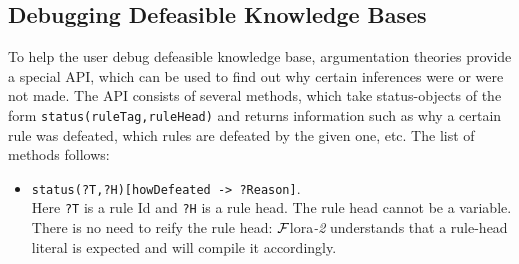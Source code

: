 \documentclass[11pt]{article}
\newcommand{\FLORA}{{\mbox{\sc ${\cal F}${lora}\rm\emph{-2}}}\xspace}
\begin{document}
\subsection{Debugging Defeasible Knowledge Bases}
\label{sec-debugging-defeat}

To help the user debug defeasible knowledge base, argumentation
theories provide a special API, which can be used to find out
why certain inferences were or were not made.
The API consists of several methods, which take status-objects of the form
{\tt status(ruleTag,ruleHead)} and returns information such as why a certain
rule was defeated, which rules are defeated by the given one, etc.
The list of methods follows:
\begin{itemize}
\item  {\tt status(?T,?H)[howDefeated -> ?Reason]}.\\
  Here {\tt ?T} is a rule Id and {\tt ?H} is a rule head. The rule head
  cannot be a variable. There is no need to reify the rule head: \FLORA
  understands that a rule-head literal is expected and will compile it
  accordingly.  


\end{itemize}
\end{document}
